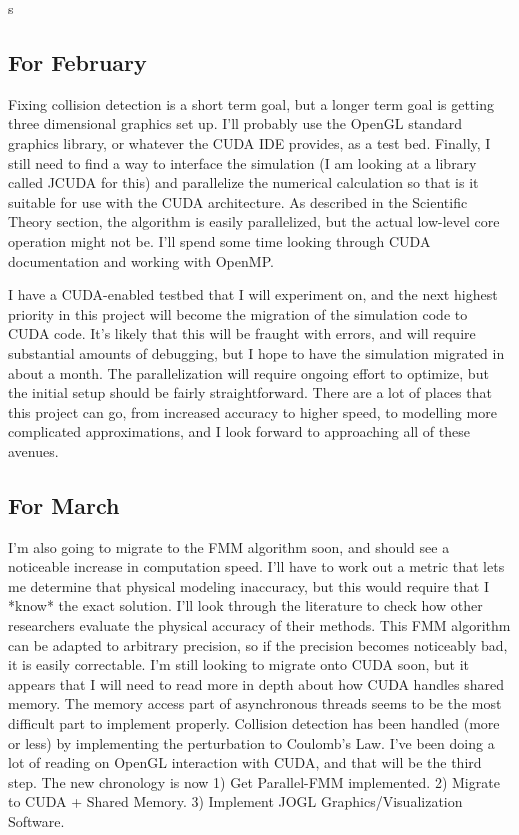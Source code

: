s\documentclass[10pt]{article}
\begin{document}
\subsection{For February}
Fixing collision detection is a short term goal, but a longer term goal is getting three dimensional graphics set up. I'll probably use the OpenGL standard graphics library, or whatever the CUDA IDE provides, as a test bed. Finally, I still need to find a way to interface the simulation (I am looking at a library called JCUDA for this) and parallelize the numerical calculation so that is it suitable for use with the CUDA architecture. As described in the Scientific Theory section, the algorithm is easily parallelized, but the actual low-level core operation might not be. I'll spend some time looking through CUDA documentation and working with OpenMP. 

I have a CUDA-enabled testbed that I will experiment on, and the next highest priority in this project will become the migration of the simulation code to CUDA code. It's likely that this will be fraught with errors, and will require substantial amounts of debugging, but I hope to have the simulation migrated in about a month. The parallelization will require ongoing effort to optimize, but the initial setup should be fairly straightforward. There are a lot of places that this project can go, from increased accuracy to higher speed, to modelling more complicated approximations, and I look forward to approaching all of these avenues.

\subsection{For March}
I'm also going to migrate to the FMM algorithm soon, and should see a noticeable increase in computation speed. I'll have to work out a metric that lets me determine that physical modeling inaccuracy, but this would require that I *know* the exact solution. I'll look through the literature to check how other researchers evaluate the physical accuracy of their methods. This FMM algorithm can be adapted to arbitrary precision, so if the precision becomes noticeably bad, it is easily correctable. I'm still looking to migrate onto CUDA soon, but it appears that I will need to read more in depth about how CUDA handles shared memory. The memory access part of asynchronous threads seems to be the most difficult part to implement properly. Collision detection has been handled (more or less) by implementing the perturbation to Coulomb's Law. I've been doing a lot of reading on OpenGL interaction with CUDA, and that will be the third step. The new chronology is now 1) Get Parallel-FMM implemented. 2) Migrate to CUDA + Shared Memory. 3) Implement JOGL Graphics/Visualization Software.
\end{document}
